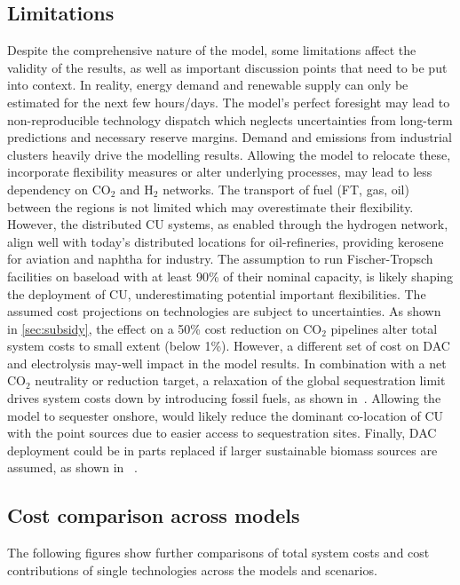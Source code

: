 \documentclass[twocolumn]{article}
\newcommand{\COtwo}{CO$_2$}
\newcommand{\Htwo}{H$_2$}
\newcommand{\carbon}{CO$_2$}
\begin{document}
\subsection{Limitations}
\label{sec:limitations}
Despite the comprehensive nature of the model, some limitations affect the validity of the results, as well as important discussion points that need to be put into context.
In reality, energy demand and renewable supply can only be estimated for the next few hours/days. The model's perfect foresight may lead to non-reproducible technology dispatch which neglects uncertainties from long-term predictions and necessary reserve margins.
Demand and emissions from industrial clusters heavily drive the modelling results. Allowing the model to relocate these, incorporate flexibility measures or alter underlying processes, may lead to less dependency on \COtwo{} and \Htwo{} networks.
The transport of fuel (FT, gas, oil) between the regions is not limited which may overestimate their flexibility. However, the distributed CU systems, as enabled through the hydrogen network, align well with today's distributed locations for oil-refineries, providing kerosene for aviation and naphtha for industry. The assumption to run Fischer-Tropsch facilities on baseload with at least 90\% of their nominal capacity, is likely shaping the deployment of CU, underestimating potential important flexibilities.
The assumed cost projections on technologies are subject to uncertainties. As shown in \ref{sec:subsidy}, the effect on a 50\% cost reduction on \carbon{} pipelines alter total system costs to small extent (below 1\%). However, a different set of cost on DAC and electrolysis may-well impact in the model results.
In combination with a net \carbon{} neutrality or reduction target, a relaxation of the global sequestration limit drives system costs down by introducing fossil fuels, as shown in~\cite{hofmannDesigningCO2Network2023}. Allowing the model to sequester onshore, would likely reduce the dominant co-location of CU with the point sources due to easier access to sequestration sites.
Finally, DAC deployment could be in parts replaced if larger sustainable biomass sources are assumed, as shown in ~\cite{lauerCrucialRoleBioenergy2023}.


\clearpage
\subsection{Cost comparison across models}

The following figures show further comparisons of total system costs and cost contributions of single technologies across the models and scenarios.
\end{document}
